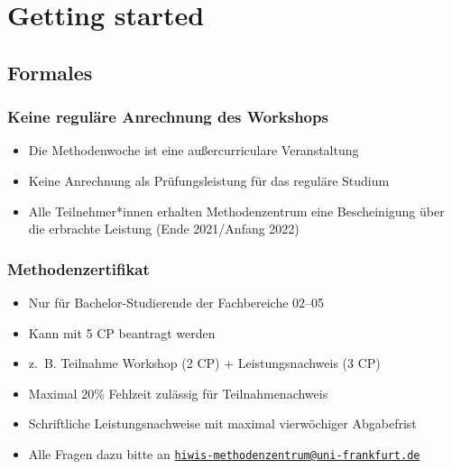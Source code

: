 \documentclass[11pt,german,a4paper]{article}
\providecommand{\tightlist}{%
  \setlength{\itemsep}{0pt}\setlength{\parskip}{0pt}}
\begin{document}
\hypertarget{getting-started}{%
\section{Getting started}\label{getting-started}}

\hypertarget{formales}{%
\subsection{Formales}\label{formales}}

\hypertarget{keine-reguluxe4re-anrechnung-des-workshops}{%
\subsubsection{Keine reguläre Anrechnung des Workshops}\label{keine-reguluxe4re-anrechnung-des-workshops}}

\begin{itemize}
\tightlist
\item
  Die Methodenwoche ist eine außercurriculare Veranstaltung
\item
  Keine Anrechnung als Prüfungsleistung für das reguläre Studium
\item
  Alle Teilnehmer*innen erhalten Methodenzentrum eine Bescheinigung über die erbrachte Leistung (Ende 2021/Anfang 2022)
\end{itemize}

\hypertarget{methodenzertifikat}{%
\subsubsection{Methodenzertifikat}\label{methodenzertifikat}}

\begin{itemize}
\tightlist
\item
  Nur für Bachelor-Studierende der Fachbereiche 02--05
\item
  Kann mit 5 CP beantragt werden
\item
  z.~B. Teilnahme Workshop (2 CP) + Leistungsnachweis (3 CP)
\item
  Maximal 20\% Fehlzeit zulässig für Teilnahmenachweis
\item
  Schriftliche Leistungsnachweise mit maximal vierwöchiger Abgabefrist
\item
  Alle Fragen dazu bitte an \href{mailto:hiwis-methodenzentrum@uni-frankfurt.de}{\nolinkurl{hiwis-methodenzentrum@uni-frankfurt.de}}
\end{itemize}
\end{document}
